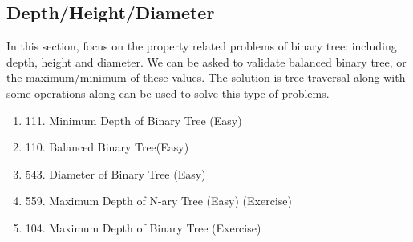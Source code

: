 \documentclass[../main.tex]{subfiles}
\begin{document}





\subsection{Depth/Height/Diameter}
In this section, focus on the property related problems of binary tree: including depth, height and diameter. We can be asked to validate balanced binary tree, or the maximum/minimum of these values. The solution is tree traversal along with some operations along can be used to solve this type of problems.
\begin{enumerate}
    \item 111. Minimum Depth of Binary Tree (Easy)
    \item 110. Balanced Binary Tree(Easy)
    \item 543. Diameter of Binary Tree (Easy)
    
    \item 559. Maximum Depth of N-ary Tree (Easy) (Exercise)
    \item 104. Maximum Depth of Binary Tree (Exercise)
\end{enumerate}
\end{document}
